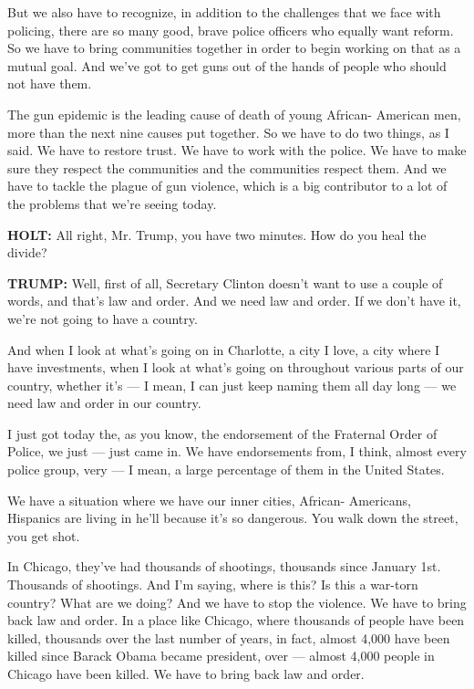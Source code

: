 But we also have to recognize, in addition to the challenges that we
face with policing, there are so many good, brave police officers who
equally want reform. So we have to bring communities together in order
to begin working on that as a mutual goal. And we've got to get guns out
of the hands of people who should not have them.

The gun epidemic is the leading cause of death of young African-
American men, more than the next nine causes put together. So we have to
do two things, as I said. We have to restore trust. We have to work with
the police. We have to make sure they respect the communities and the
communities respect them. And we have to tackle the plague of gun
violence, which is a big contributor to a lot of the problems that we're
seeing today.

\textbf{HOLT:} All right, Mr. Trump, you have two minutes. How do you
heal the divide?

\textbf{TRUMP:} Well, first of all, Secretary Clinton doesn't want to
use a couple of words, and that's law and order. And we need law and
order. If we don't have it, we're not going to have a country.

And when I look at what's going on in Charlotte, a city I love, a city
where I have investments, when I look at what's going on throughout
various parts of our country, whether it's --- I mean, I can just keep
naming them all day long --- we need law and order in our country.

I just got today the, as you know, the endorsement of the Fraternal
Order of Police, we just --- just came in. We have endorsements from, I
think, almost every police group, very --- I mean, a large percentage of
them in the United States.

We have a situation where we have our inner cities, African- Americans,
Hispanics are living in he'll because it's so dangerous. You walk down
the street, you get shot.

In Chicago, they've had thousands of shootings, thousands since January
1st. Thousands of shootings. And I'm saying, where is this? Is this a
war-torn country? What are we doing? And we have to stop the violence.
We have to bring back law and order. In a place like Chicago, where
thousands of people have been killed, thousands over the last number of
years, in fact, almost 4,000 have been killed since Barack Obama became
president, over --- almost 4,000 people in Chicago have been killed. We
have to bring back law and order.

